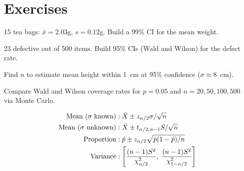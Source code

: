 \section{Exercises}

\begin{exercise}[$\star$]
15 tea bags: $\bar{x}=2.03$g, $s=0.12$g. Build a 99\% CI for the mean weight.
\end{exercise}

\begin{exercise}[$\star$]
23 defective out of 500 items. Build 95\% CIs (Wald and Wilson) for the defect rate.
\end{exercise}

\begin{exercise}[$\star\star$]
Find $n$ to estimate mean height within 1~cm at 95\% confidence ($\sigma\approx 8$~cm).
\end{exercise}

\begin{exercise}
Compare Wald and Wilson coverage rates for $p=0.05$ and $n=20,50,100,500$ via Monte Carlo.
\end{exercise}

\begin{keyformulas}
\begin{align*}
\text{Mean ($\sigma$ known)} &: \bar{X}\pm z_{\alpha/2}\sigma/\sqrt{n} \\
\text{Mean ($\sigma$ unknown)} &: \bar{X}\pm t_{\alpha/2,n-1}S/\sqrt{n} \\
\text{Proportion} &: \hat{p}\pm z_{\alpha/2}\sqrt{\hat{p}(1-\hat{p})/n} \\
\text{Variance} &: \left[\frac{(n-1)S^2}{\chi^2_{\alpha/2}},\;\frac{(n-1)S^2}{\chi^2_{1-\alpha/2}}\right]
\end{align*}
\end{keyformulas}
